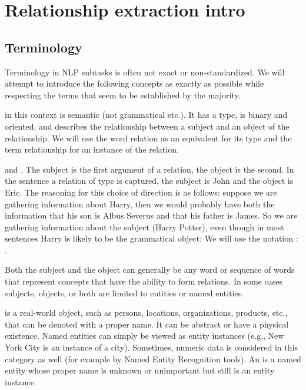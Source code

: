 \chapter{Relationship extraction intro} 

\section{Terminology}
Terminology in NLP subtasks is often not exact or non-standardized. We will attempt to introduce the following concepts as exactly as possible while respecting the terms that seem to be established by the majority. 


 in this context is semantic (not grammatical etc.). It has a type, is binary and oriented, and describes the relationship between a subject and an object of the relationship. We will use the word relation as an equivalent for its type and the term relationship for an instance of the relation. 

 and . The subject is the first argument of a relation, the object is the second. In the sentence  a relation of type is captured, the subject is John and the object is Eric. The reasoning for this choice of direction is as follows: suppose we are gathering information about Harry, then we would probably have both the information that his son is Albus Severus and that his father is James. So we are gathering information about the subject (Harry Potter), even though in most sentences Harry is likely to be the grammatical object:  We will use the notation : . 

Both the subject and the object can generally be any word or sequence of words that represent concepts that have the ability to form relations. In some cases subjects, objects, or both are limited to entities or named entities.

   is a real-world object, such as persons, locations, organizations, products, etc., that can be denoted with a proper name. It can be abstract or have a physical existence. Named entities can simply be viewed as entity instances (e.g., New York City is an instance of a city). Sometimes, numeric data is considered in this category as well (for example by Named Entity Recognition tools). An  is a named entity whose proper name is unknown or unimportant but still is an entity instance. 

